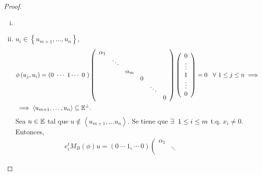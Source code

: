 \begin{proof}
    \begin{enumerate}[i)]
        \item[]
        \item \addtocounter{enumi}{1}
            $u_i  \in \left\{u_{m+1}, \dots , u_n \right\}$,
            \[
                \begin{aligned}
                    &\phi \left( u_j, u_i \right) = \left( 0 \ \cdots \ 1 \cdots \ 0 \ \right) \left( 
                    \begin{array}{cccccc}
                        \alpha _1 &  &  &  &  &  \\
                         & \ddots &  &  &  &  \\
                         &  & \alpha _m &  &  & \\
                         &  &  & 0 &  &   \\
                         &  & \ &  & \ddots &  \\
                         &  &  &  &  & 0 
                    \end{array} \right) \left(
                    \begin{array}{c}
                         0  \\
                         \vdots  \\
                         1  \\
                         \vdots \\
                         0 
                    \end{array} \right) = 0 \hspace{0,3cm} \forall \hspace{0,12cm} 1 \leq j \leq n
                    \implies \\
                    &\implies \left< u_{m+1} , \dots , u_n \right> \subseteq \E^{\perp}.
                \end{aligned}
            \]
            Sea $u \in \mathbb{E}$ tal que $u \notin \left< u_{m+1}, \dots u_n \right> $. Se tiene que $\exists \hspace{0,2cm} 1 \leq i \leq m$ t.q. $x_i \neq 0$. Entonces,
            \[
                \begin{aligned}
                    e_i^t M_B\left( \phi \right) u = \left(0 \ \cdots \ 1 _i \ \cdots \ 0 \right) \left( 
                    \begin{array}{cccccc}
                        \alpha _1 &  &  &  &  &  \\
                         & \ddots &  &  &  &  \\

\end{array}
\end{aligned}\]
\end{enumerate}
\end{proof}

